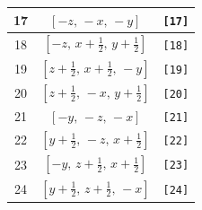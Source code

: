 \documentclass[fleqn,8pt]{jsarticle}
\begin{document}
\begin{longtable}{ccc}
17 & $\left[ - z,\, - x,\, - y \right]$ & {\tt [17]} \\ \hline
18 & $\left[ - z,\, x + \frac{1}{2},\, y + \frac{1}{2} \right]$ & {\tt [18]} \\ \hline
19 & $\left[ z + \frac{1}{2},\, x + \frac{1}{2},\, - y \right]$ & {\tt [19]} \\ \hline
20 & $\left[ z + \frac{1}{2},\, - x,\, y + \frac{1}{2} \right]$ & {\tt [20]} \\ \hline
21 & $\left[ - y,\, - z,\, - x \right]$ & {\tt [21]} \\ \hline
22 & $\left[ y + \frac{1}{2},\, - z,\, x + \frac{1}{2} \right]$ & {\tt [22]} \\ \hline
23 & $\left[ - y,\, z + \frac{1}{2},\, x + \frac{1}{2} \right]$ & {\tt [23]} \\ \hline
24 & $\left[ y + \frac{1}{2},\, z + \frac{1}{2},\, - x \right]$ & {\tt [24]} \\
\end{longtable}
\end{document}
